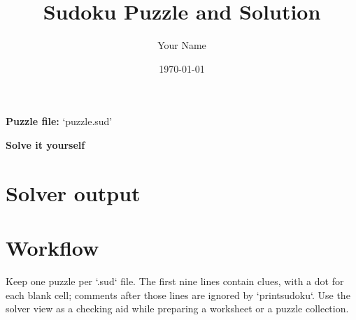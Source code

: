 \documentclass[11pt,a4paper]{article}
\title{Sudoku Puzzle and Solution}
\author{Your Name}
\date{\today}
\begin{document}
\maketitle

\noindent\textcolor{puzzleblue}{\bfseries Puzzle file:} `puzzle.sud'\par
\medskip

\begin{center}
  {\large\bfseries Solve it yourself}\par\medskip
  \cluefont{\Large}
\end{center}

\newpage
\section*{Solver output}
\cluefont{\small}

\section*{Workflow}
Keep one puzzle per `.sud` file.  The first nine lines contain clues, with a
dot for each blank cell; comments after those lines are ignored by
`printsudoku`.  Use the solver view as a checking aid while preparing a
worksheet or a puzzle collection.
\end{document}
